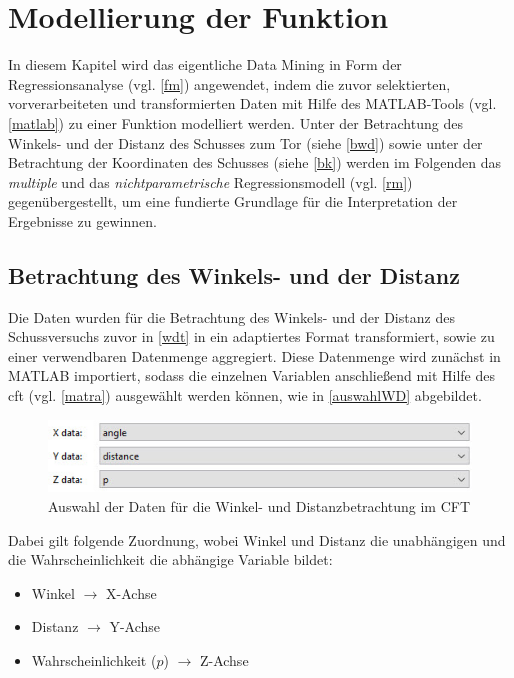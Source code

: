 \section{Modellierung der Funktion}
\label{mdf}
In diesem Kapitel wird das eigentliche Data Mining in Form der Regressionsanalyse (vgl. \vref{fm}) angewendet, indem die zuvor selektierten, vorverarbeiteten und transformierten Daten mit Hilfe des MATLAB-Tools (vgl. \vref{matlab}) zu einer Funktion modelliert werden. Unter der Betrachtung des Winkels- und der Distanz des Schusses zum Tor (siehe \vref{bwd}) sowie unter der Betrachtung der Koordinaten des Schusses (siehe \vref{bk}) werden im Folgenden das \textit{multiple} und das \textit{nichtparametrische} Regressionsmodell (vgl. \vref{rm}) gegenübergestellt, um eine fundierte Grundlage für die Interpretation der Ergebnisse zu gewinnen.


\subsection{Betrachtung des Winkels- und der Distanz}
\label{bwd}
Die Daten wurden für die Betrachtung des Winkels- und der Distanz des Schussversuchs zuvor in \vref{wdt} in ein adaptiertes Format transformiert, sowie zu einer verwendbaren Datenmenge aggregiert. Diese Datenmenge wird zunächst in MATLAB importiert, sodass die einzelnen Variablen anschließend mit Hilfe des \gls{cft} (vgl. \vref{matra}) ausgewählt werden können, wie in \vref{auswahlWD} abgebildet.

\begin{figure}[H]
\centering
\includegraphics[scale=0.8]{se-wa-jpg/auswahlWD}
\caption{Auswahl der Daten für die Winkel- und Distanzbetrachtung im CFT}
\label{auswahlWD}
\end{figure}

Dabei gilt folgende Zuordnung, wobei Winkel und Distanz die unabhängigen und die Wahrscheinlichkeit die abhängige Variable bildet:

\begin{itemize}
\item Winkel $\rightarrow$  X-Achse
\item Distanz $\rightarrow$ Y-Achse
\item Wahrscheinlichkeit ($p$) $\rightarrow$ Z-Achse
\end{itemize}

